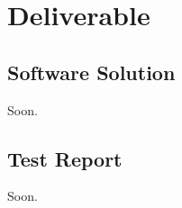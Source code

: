 \chapter{Deliverable}
\label{chap:deliverable}

\section{Software Solution}
\label{section:software-solution}
Soon.

\section{Test Report}
\label{section:test-report}
Soon.